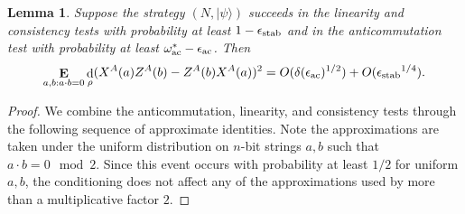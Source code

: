 \documentclass[11pt,letterpaper]{article}
\newcommand{\<}{\langle}
\renewcommand{\>}{\rangle}
\newtheorem{lemma}[theorem]{Lemma}
\newcommand{\ket}[1]{| #1 \>}
\newcommand{\eps}{\epsilon}
\DeclareMathOperator{\E}{\mathbf{E}}
\DeclareMathOperator{\DIS}{d}
\DeclareMathOperator{\Drho}{\DIS_\rho}
\newcommand{\wg}{\omega^*_{\ensuremath{\rm ac}}}
\newcommand{\ac}{{\ensuremath{\rm ac}}}
\newcommand{\stab}{\ensuremath{\rm stab}}
\begin{document}
\begin{lemma}\label{lem:commutation}
  Suppose the strategy $(N,\ket{\psi})$ succeeds in the
  linearity and consistency tests with probability at least 
  $1-\eps_{\stab}$ and in the anticommutation test with probability at least $\wg - \eps_\ac$. Then
$$\E_{a,b:a\cdot b=0} \Drho(X^A(a){Z^A}(b) -  {Z^A}(b)X^A(a))^2 =O(\delta(\eps_\ac)^{1/2})+ O({\eps_{\stab}}^{1/4}).$$ 
\end{lemma}

\begin{proof}
We combine the anticommutation, linearity, and consistency tests through the following sequence of approximate identities. Note the approximations are taken under the uniform distribution on $n$-bit strings $a,b$ such that $a\cdot b=0\mod 2$. Since this event occurs with probability at least $1/2$ for uniform $a,b$, the conditioning does not affect any of the approximations used by more than a multiplicative factor $2$. 


\end{proof}
\end{document}
